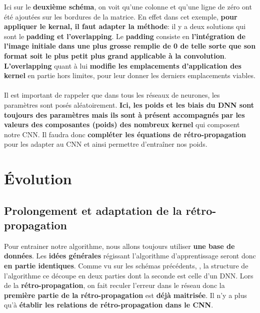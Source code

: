 \documentclass[12pt,a4paper]{extarticle}
\begin{document}
Ici sur le \textbf{deuxième schéma}, on voit qu'une colonne et qu'une ligne de zéro ont été ajoutées sur les bordures de la matrice. En effet dans cet exemple, \textbf{pour appliquer le kernal, il faut adapter la méthode}: il y a deux solutions qui sont le \textbf{padding et l'overlapping}. Le \textbf{padding} consiste en \textbf{l'intégration de l'image initiale dans une plus grosse remplie de 0 de telle sorte que son format soit le plus petit plus grand applicable à la convolution}. \textbf{L'overlapping} quant à lui \textbf{modifie les emplacements d'application des kernel} en partie hors limites, pour leur donner les derniers emplacements viables. \\ \\
\indent Il est important de rappeler que dans tous les réseaux de neurones, les paramètres sont posés aléatoirement.\textbf{ Ici, les poids et les biais du DNN sont toujours des paramètres mais ils sont à présent accompagnés par les valeurs des composantes (poids) des nombreux kernel} qui composent notre CNN. Il faudra donc \textbf{compléter les équations de rétro-propagation} pour les adapter au CNN et ainsi permettre d'entraîner nos poids. 

\section{Évolution}
\subsection{Prolongement et adaptation de la rétro-propagation}
Pour entrainer notre algorithme, nous allons toujours utiliser \textbf{une base de données}. Les \textbf{idées générales} régissant l'algorithme d'apprentissage seront donc \textbf{en partie identiques}. Comme vu sur les schémas précédents, , la structure de l'algorithme ce découpe en deux parties dont la seconde est celle d'un DNN. Lors de la \textbf{rétro-propagation}, on fait reculer l'erreur dans le réseau donc la \textbf{première partie de la rétro-propagation} est \textbf{déjà maitrisée}. Il n'y a plus qu'à \textbf{établir les relations de rétro-propagation dans le CNN}. 
\end{document}
